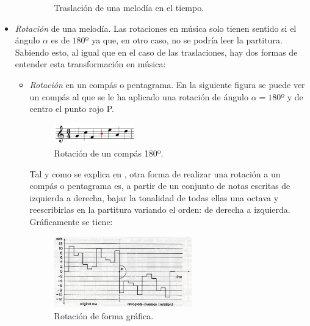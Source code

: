 \documentclass[a4paper, openright, 11pt, titlepage]{report}
\theoremstyle{definition}\newtheorem{defin}[propo]{Definition}
\theoremstyle{definition}\newtheorem{obser}[propo]{Remark}
\theoremstyle{definition}\newtheorem{ejem}[propo]{Ejemplo}
\theoremstyle{definition}\newtheorem{algoritmo}[propo]{Algoritmo}
\begin{document}
\begin{itemize}
\begin{enumerate}
\begin{figure}[H]
            \caption{Traslación de una melodía en el tiempo.}
        \end{figure}
    \end{enumerate}
    \item \textit{Rotación} de una melodía. Las rotaciones en música solo tienen sentido si el ángulo $\alpha$ es de $180º$ ya que, en otro caso, no se podría leer la partitura. Sabiendo esto, al igual que en el caso de las traslaciones, hay dos formas de entender esta transformación en música:
    \begin{itemize}
        \item \textit{Rotación} en un compás o pentagrama. En la siguiente figura se puede ver un compás al que se le ha aplicado una rotación de ángulo $\alpha = 180º$ y de centro el punto rojo P.
        \begin{figure}[H]
            \centering
            \includegraphics[width = 0.35\textwidth]{rotacionPartitura.png}
            \caption{Rotación de un compás 180º.}
        \end{figure}
        Tal y como se explica en \cite{didactica}, otra forma de realizar una rotación a un compás o pentagrama es, a partir de un conjunto de notas escritas de izquierda a derecha, bajar la tonalidad de todas ellas una octava y reescribirlas en la partitura variando el orden: de derecha a izquierda. Gráficamente se tiene:
        \begin{figure}[H]
            \centering
            \includegraphics[width = 0.6\textwidth]{rotacionGrafica.png}
            \caption{Rotación de forma gráfica. \cite{didactica}}
        \end{figure}
        

\end{itemize}
\end{itemize}
\end{document}
